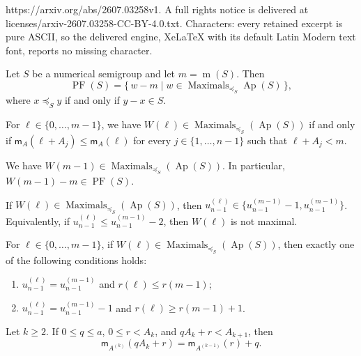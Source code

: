 \documentclass[10pt,a4paper]{amsart}
\begin{document}
https://arxiv.org/abs/2607.03258v1. A full rights notice is delivered at licenses/arxiv-2607.03258-CC-BY-4.0.txt. Characters: every retained excerpt is pure ASCII, so the delivered engine, XeLaTeX with its default Latin Modern text font, reports no missing character.
\begin{proposition}\label{prop:PF1}
Let $S$ be a numerical semigroup and let $m=\operatorname{m}(S)$. Then
\[
\operatorname{PF}(S)=
\{\,w-m \mid w\in \operatorname{Maximals}_{\preceq_S}\operatorname{Ap}(S)\,\},
\]
where $x\preceq_S y$ if and only if $y-x\in S$.
\end{proposition}

\begin{theorem}\label{th:maxcrit_mA}
For $\ell\in\{0,\ldots,m-1\}$, we have $W(\ell) \in \operatorname{Maximals}_{\preceq_S}(\operatorname{Ap}(S))$ if and only if $\mathsf{m}_A(\ell+A_j)\le \mathsf{m}_A(\ell)$ for every $j\in\{1,\ldots,n-1\}$ such that $\ell+A_j<m$.
\end{theorem}

\begin{corollary}\label{cor:mminus1_maximal}
We have $W(m-1) \in \operatorname{Maximals}_{\preceq_S}(\operatorname{Ap}(S))$. In particular, $W(m-1)-m\in\operatorname{PF}(S)$.
\end{corollary}

\begin{corollary}\label{cor:two_layers}
If $W(\ell) \in \operatorname{Maximals}_{\preceq_S}(\operatorname{Ap}(S))$, then
$u_{n-1}^{(\ell)}\in\{u_{n-1}^{(m-1)}-1,u_{n-1}^{(m-1)}\}$.
Equivalently, if $u_{n-1}^{(\ell)}\le u_{n-1}^{(m-1)}-2$, then
$W(\ell)$ is not maximal.
\end{corollary}

\begin{corollary}\label{cor:two_bands}
For $\ell\in\{0,\ldots,m-1\}$, if $W(\ell) \in \operatorname{Maximals}_{\preceq_S}(\operatorname{Ap}(S))$, then exactly one of the following
conditions holds:
\begin{enumerate}
\item[\rm(I)] $u_{n-1}^{(\ell)}=u_{n-1}^{(m-1)}$ and
$r(\ell)\le r(m-1)$;
\item[\rm(II)] $u_{n-1}^{(\ell)}=u_{n-1}^{(m-1)}-1$ and
$r(\ell)\ge r(m-1)+1$.
\end{enumerate}
\end{corollary}

\begin{lemma}\label{lem:splitting-lambda}
Let $k\ge 2$. If $0\le q\le a$, $0\le r<A_k$, and $qA_k+r<A_{k+1}$, then
\[
\mathsf m_{A^{(k)}}(qA_k+r)=\mathsf m_{A^{(k-1)}}(r)+q.
\]
\end{lemma}
\end{document}
